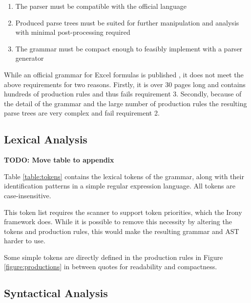 \documentclass[12pt,a4paper,onecolumn,oneside]{memoir}
\newcommand{\todo}[1]{\textbf{TODO: #1}}
\begin{document}
\begin{enumerate}
\label{sec:designgoals}
\item The parser must be compatible with the official language
\item Produced parse trees must be suited for further manipulation and analysis with minimal post-processing required
\item The grammar must be compact enough to feasibly implement with a parser generator
\end{enumerate}

While an official grammar for Excel formulas is published \cite{ExcelOfficialGrammar}, it does not meet the above requirements for two reasons.
Firstly, it is over 30 pages long and contains hundreds of production rules and thus fails requirement 3.
Secondly, because of the detail of the grammar and the large number of production rules the resulting parse trees are very complex and fail requirement 2.

\subsection{Lexical Analysis}
\label{sec:lexanalysis}

\begin{table}
\tiny
\caption{Lexical tokens used in the XLParser grammar, as refered to in section \ref{sec:lexanalysis}.}
\label{table:tokens}
\centerfloat

\end{table}

\todo{Move table to appendix}

Table \ref{table:tokens} contains the lexical tokens of the grammar, along with their identification patterns in a simple regular expression language. All tokens are case-insensitive.

This token list requires the scanner to support token priorities, which the Irony framework does.
While it is possible to remove this necessity by altering the tokens and production rules, this would make the resulting grammar and AST harder to use.

Some simple tokens are directly defined in the production rules in Figure \ref{figure:productions} in between quotes for readability and compactness.

\subsection{Syntactical Analysis}
\end{document}
